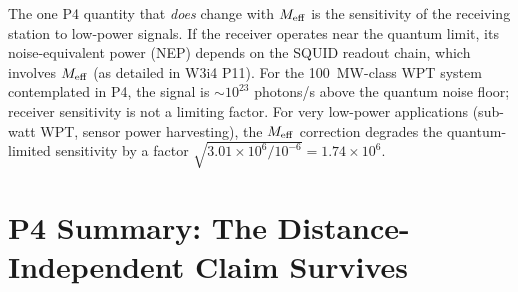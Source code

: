 \documentclass[11pt]{article}
\newcommand{\ee}[1]{\times 10^{#1}}
\newcommand{\Meff}{M_{\rm eff}}
\begin{document}
The one P4 quantity that \emph{does} change with $\Meff$ is the sensitivity
of the receiving station to low-power signals. If the receiver operates near
the quantum limit, its noise-equivalent power (NEP) depends on the SQUID
readout chain, which involves $\Meff$ (as detailed in W3i4 P11). For the
100~MW-class WPT system contemplated in P4, the signal is $\sim 10^{23}$
photons/s above the quantum noise floor; receiver sensitivity is not a limiting
factor. For very low-power applications (sub-watt WPT, sensor power
harvesting), the $\Meff$ correction degrades the quantum-limited sensitivity
by a factor $\sqrt{3.01\ee{6}/10^{-6}} = 1.74\ee{6}$.

\section{P4 Summary: The Distance-Independent Claim Survives}
\label{sec:P4-summary}
\end{document}
